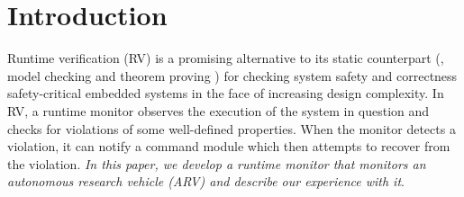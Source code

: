 \section{Introduction}
Runtime verification (RV) is a promising alternative to its static counterpart (\eg, model checking \cite{Clarke1996} and theorem proving \cite{Chang1997}) 
for checking system safety and correctness safety-critical embedded systems in the face of increasing design complexity. 
In RV, a runtime monitor observes the execution of the system in question and checks for violations of some well-defined properties. 
When the monitor detects a violation, it can notify a command module which then attempts to recover from the violation. \emph{In this paper, we develop a runtime monitor that monitors an autonomous research vehicle (ARV) and describe our experience with it}.

